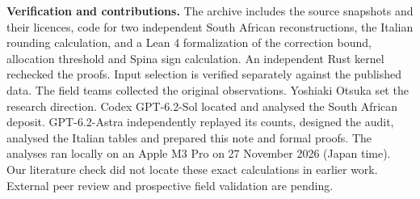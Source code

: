 \documentclass[10pt]{article}
\newcommand{\para}[1]{\medskip\textbf{#1}\enspace}
\begin{document}
\para{Verification and contributions.}
The archive includes the source snapshots and their licences, code for two independent South African reconstructions, the Italian rounding calculation, and a Lean 4 formalization of the correction bound, allocation threshold and Spina sign calculation. An independent Rust kernel rechecked the proofs. Input selection is verified separately against the published data. The field teams collected the original observations. Yoshiaki Otsuka set the research direction. Codex GPT-6.2-Sol located and analysed the South African deposit. GPT-6.2-Astra independently replayed its counts, designed the audit, analysed the Italian tables and prepared this note and formal proofs. The analyses ran locally on an Apple M3 Pro on 27 November 2026 (Japan time). Our literature check did not locate these exact calculations in earlier work. External peer review and prospective field validation are pending.
\end{document}
